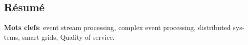 \begin{otherlanguage}{french}
\cleardoublepage
\chapter*{Résumé}
\vspace{2cm}
% 
% 

\vskip1.5cm
\textbf{Mots clefs}: event stream processing, complex event processing, distributed systems, smart grids, Quality of service. 
\end{otherlanguage}


